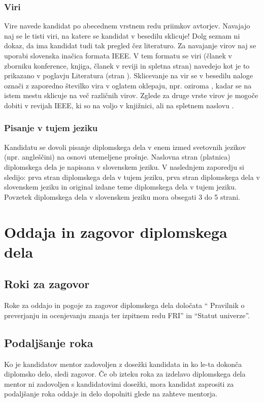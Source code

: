 \documentclass[12pt,a4paper]{book}
\begin{document}
\subsection{Viri}
Vire navede kandidat po abecednem vrstnem redu priimkov avtorjev. Navajajo naj se le tisti viri, na katere se
kandidat v besedilu sklicuje! Dolg seznam ni dokaz, da ima kandidat tudi tak pregled čez literaturo. Za navajanje virov naj se uporabi
slovenska inačica formata IEEE. V tem formatu se viri (članek v zborniku konference,  knjiga, članek v reviji in spletna stran) navedejo  kot
je to prikazano v poglavju Literatura (stran \pageref{stran_literatura}). Sklicevanje na vir se v besedilu naloge označi z zaporedno številko
vira v oglatem oklepaju, npr. \cite{peytonjones93} oziroma \cite{trucco98,wadler89,IEEE}, kadar se na istem mestu sklicuje na več
različnih virov.  Zglede za druge vrste virov je mogoče dobiti v revijah IEEE, ki so na voljo v knjižnici, ali na spletnem naslovu
\cite{IEEE}.

\subsection{Pisanje v tujem jeziku}
Kandidatu se dovoli pisanje diplomskega dela v enem izmed svetovnih jezikov (npr. angleščini) na osnovi utemeljene prošnje. Naslovna stran
(platnica) diplomskega dela je napisana v slovenskem jeziku. V naslednjem zaporedju si sledijo: prva stran diplomskega dela v tujem jeziku,
prva stran diplomskega dela v slovenskem jeziku in original izdane teme diplomskega dela v tujem jeziku. Povzetek diplomskega dela v slovenskem
jeziku mora obsegati 3 do 5 strani. 


\chapter{Oddaja in zagovor diplomskega dela}

\section{Roki za zagovor}
Roke za oddajo in pogoje za zagovor diplomskega dela določata ``
Pravilnik o preverjanju in ocenjevanju znanja ter izpitnem redu FRI''
in ``Statut univerze''.

\section{Podalj\v sanje roka}
Ko je kandidatov mentor zadovoljen z dosežki kandidata in ko le-ta do\-kon\-ča diplomsko delo, sledi zagovor. Če ob izteku roka za izdelavo
diplomskega dela mentor ni zadovoljen s kandidatovimi dosežki, mora kandidat zaprositi za podaljšanje roka oddaje in delo dopolniti glede na
zahteve mentorja.
\end{document}
